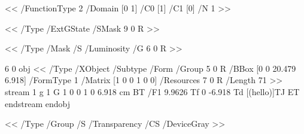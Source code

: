 <<
    /FunctionType 2
    /Domain [0 1]
    /C0 [1]
    /C1 [0]
/N 1 >> 

<<
    /Type /ExtGState
    /SMask 9 0 R
>> 

<<
    /Type /Mask
    /S /Luminosity
    /G 6 0 R
>> 

6 0 obj                     %
<<
/Type /XObject
/Subtype /Form
/Group 5 0 R 
/BBox [0 0 20.479 6.918]
/FormType 1
/Matrix [1 0 0 1 0 0]
/Resources 7 0 R
/Length 71        
>>
stream
1 g 1 G
1 0 0 1 0 6.918 cm
BT
/F1 9.9626 Tf 0 -6.918 Td [(hello)]TJ
ET
endstream
endobj

<<
    /Type /Group
    /S /Transparency
    /CS /DeviceGray
>> 
\elisting

